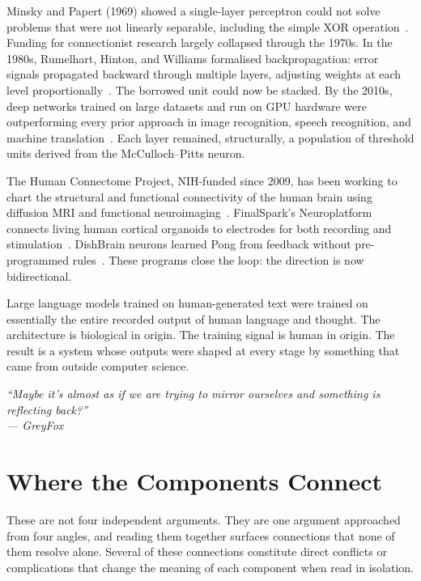 \documentclass[12pt, a4paper]{article}
\begin{document}
Minsky and Papert (1969) showed a single-layer perceptron could not solve problems that were not
linearly separable, including the simple XOR operation~\cite{Bor-3}. Funding for connectionist
research largely collapsed through the 1970s. In the 1980s, Rumelhart, Hinton, and Williams
formalised backpropagation: error signals propagated backward through multiple layers, adjusting
weights at each level proportionally~\cite{Bor-4}. The borrowed unit could now be stacked. By the
2010s, deep networks trained on large datasets and run on GPU hardware were outperforming every prior
approach in image recognition, speech recognition, and machine translation~\cite{Bor-5}. Each layer
remained, structurally, a population of threshold units derived from the McCulloch--Pitts neuron.

The Human Connectome Project, NIH-funded since 2009, has been working to chart the structural and
functional connectivity of the human brain using diffusion MRI and functional
neuroimaging~\cite{Bor-6}. FinalSpark's Neuroplatform connects living human cortical organoids to
electrodes for both recording and stimulation~\cite{Bor-8}. DishBrain neurons learned Pong from
feedback without pre-programmed rules~\cite{Bor-9}. These programs close the loop: the direction is
now bidirectional.

Large language models trained on human-generated text were trained on essentially the entire recorded
output of human language and thought. The architecture is biological in origin. The training signal
is human in origin. The result is a system whose outputs were shaped at every stage by something that
came from outside computer science.

\begin{displayquote}
\itshape
``Maybe it's almost as if we are trying to mirror ourselves and something is reflecting back?''\\
\upshape --- GreyFox
\end{displayquote}

\section{Where the Components Connect}

These are not four independent arguments. They are one argument approached from four angles, and
reading them together surfaces connections that none of them resolve alone. Several of these
connections constitute direct conflicts or complications that change the meaning of each component
when read in isolation.
\end{document}
